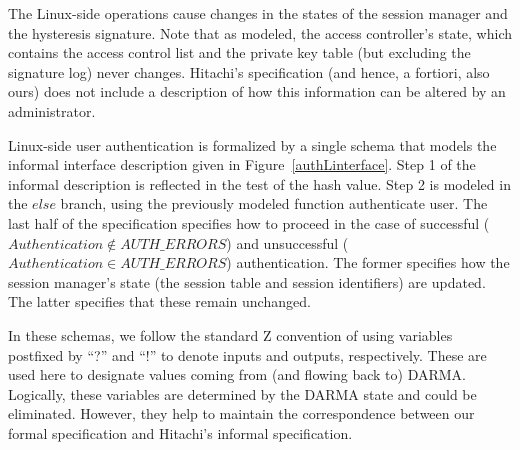 \documentclass[a4paper,pdftex]{article}
\begin{document}
The Linux-side operations cause changes in the states of the session
manager and the hysteresis signature.  Note that as
modeled, the access controller's state, which contains the access
control list and the private key table (but excluding the signature log)
never changes.  Hitachi's specification (and hence, a fortiori, also
ours) does not include a description of how this information can be
altered by an administrator.

Linux-side user authentication is formalized by a single schema that
models the informal interface description given in Figure~\ref{authLinterface}.
Step 1 of the informal description is reflected in the test of the
hash value.  Step 2 is modeled in the $else$ branch, using the
previously modeled function authenticate user.   The last half of
the specification specifies how to proceed in the case of
successful ($Authentication \notin AUTH\_ERRORS$) and unsuccessful
($Authentication \in AUTH\_ERRORS$) authentication.   The former
specifies how the session manager's state (the session table and session
identifiers) are updated.  The latter specifies that these remain
unchanged.

In these schemas, we follow the standard Z convention
of using variables postfixed by ``?'' and ``!'' to denote inputs and
outputs, respectively.    These are used here to designate
values coming from (and flowing back to) DARMA.
Logically, these variables are determined by the DARMA state
and could be eliminated.  However, they help to maintain 
the correspondence between our formal specification and Hitachi's
informal specification.
\end{document}

